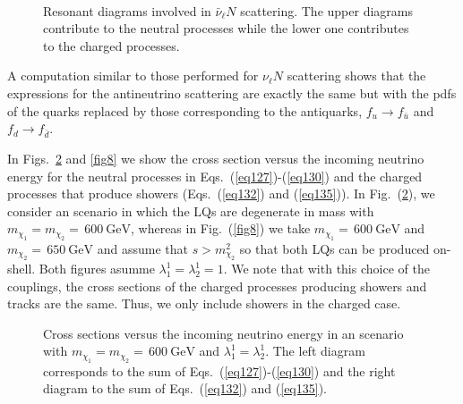 \documentclass[aps,preprint,tightenlines,floatfix,superscriptaddress,nofootinbib,showpacs]{revtex4-1}
\begin{document}
\begin{center}
\begin{figure}[H]
\centering
\hspace*{0.2\textwidth}
\\
\caption{Resonant diagrams involved in $\bar{\nu}_{\ell}N$ scattering. The upper diagrams contribute to the neutral processes while the lower one contributes to the charged processes.}
\label{fig6}
\end{figure}
\end{center}
\par
A computation similar to those performed for $\nu_{\ell}N$ scattering shows that the expressions for the antineutrino scattering are exactly the same but with the pdfs of the quarks replaced by those corresponding to the antiquarks, $f_u\to f_{\bar{u}}$ and $f_d\to f_{\bar{d}}$.
\par In Figs.~\ref{fig7} and \ref{fig8} we show the cross section versus the incoming neutrino energy for the neutral processes in Eqs.~(\ref{eq127})-(\ref{eq130}) and the charged processes that produce showers (Eqs.~(\ref{eq132}) and (\ref{eq135})). In Fig.~(\ref{fig7}), we consider an scenario in which the LQs are degenerate in mass with $m_{\chi_1}=m_{\chi_2}=\,600~\mathrm{GeV}$, whereas in Fig.~(\ref{fig8}) we take $m_{\chi_1}=\,600~\mathrm{GeV}$ and $m_{\chi_2}=\,650~\mathrm{GeV}$ and assume that $s>m^2_{\chi_2}$ so that both LQs can be produced on-shell. Both figures asumme $\lambda^1_1=\lambda^1_2=1$. We note that with this choice of the couplings, the cross sections of the charged processes producing showers and tracks are the same. Thus, we only include showers in the charged case. 
\begin{center}
\begin{figure}[H]
\centering
\hspace*{4mm}
\caption{Cross sections versus the incoming neutrino energy in an scenario with $m_{\chi_1}=m_{\chi_2}=\,600~\mathrm{GeV}$ and $\lambda^1_1=\lambda^1_2$. The left diagram corresponds to the sum of Eqs.~(\ref{eq127})-(\ref{eq130}) and the right diagram to the sum of Eqs.~(\ref{eq132}) and (\ref{eq135}).}
\label{fig7}
\end{figure}
\end{center}
\end{document}
